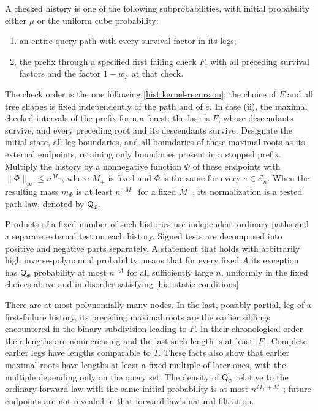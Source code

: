 \begin{definition}\label{hist:tested-law}
A checked history is one of the following subprobabilities, with initial
probability either $\mu$ or the uniform cube probability:
\begin{enumerate}
\item[(i)] an entire query path with every survival factor in its legs;
\item[(ii)] the prefix through a specified first failing check $F$, with all
preceding survival factors and the factor $1-w_F$ at that check.
\end{enumerate}
The check order is the one following \eqref{hist:kernel-recursion}; the
choice of $F$ and all tree shapes is fixed independently of the path and
of $e$.  In case (ii), the maximal checked intervals of the prefix form a
forest: the last is $F$, whose descendants survive, and every preceding
root and its descendants survive.  Designate the initial state, all leg
boundaries, and all boundaries of these maximal roots as its external
endpoints, retaining only boundaries present in a stopped prefix.  Multiply
the history by a nonnegative function $\Phi$ of these
endpoints with $\|\Phi\|_\infty\le n^{M_+}$, where $M_+$ is fixed and
$\Phi$ is the same for every $e\in\mathscr E_n$.  When the resulting mass
$m_\Phi$ is at least $n^{-M_-}$ for a fixed $M_-$, its normalization is a
tested path law, denoted by $\mathsf Q_\Phi$.

Products of a fixed number of such histories use independent ordinary
paths and a separate external test on each history.  Signed tests are
decomposed into positive and negative parts separately.  A statement that
holds with arbitrarily high inverse-polynomial probability means that for
every fixed $A$ its exception has $\mathsf Q_\Phi$ probability at most
$n^{-A}$ for all sufficiently large $n$, uniformly in the fixed choices
above and in disorder satisfying \eqref{hist:static-conditions}.
\end{definition}

There are at most polynomially many nodes.  In the last, possibly partial,
leg of a first-failure history, its preceding maximal roots are the earlier
siblings encountered in the binary subdivision leading to $F$.  In their
chronological order their lengths are nonincreasing and the last such
length is at least $|F|$.  Complete earlier legs have lengths comparable
to $T$.  These facts also show that earlier maximal roots have lengths at
least a fixed multiple of later ones, with the multiple depending only on
the query set.  The density of $\mathsf Q_\Phi$ relative to the ordinary
forward law with the same initial probability is at most
$n^{M_++M_-}$; future endpoints are not revealed in that forward law's
natural filtration.


